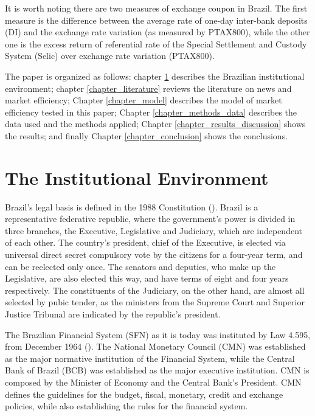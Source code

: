 \documentclass[cic,tc, english]{iiufrgs}
\begin{document}
    It is worth noting there are two measures of exchange coupon in Brazil. The first measure is the difference between the average rate of one-day inter-bank deposits (DI) and the exchange rate variation (as measured by PTAX800), while the other one is the excess return of referential rate of the Special Settlement and Custody System (Selic) over exchange rate variation (PTAX800). 
  
    The paper is organized as follows: chapter \ref{chapter_institutional} describes the Brazilian institutional environment; chapter \ref{chapter_literature} reviews the literature on news and market efficiency; Chapter \ref{chapter_model} describes the model of market efficiency tested in this paper; Chapter \ref{chapter_methods_data} describes the data used and the methods applied; Chapter \ref{chapter_results_discussion} shows the results; and finally Chapter \ref{chapter_conclusion} shows the conclusions.

\chapter{The Institutional Environment} \label{chapter_institutional}

    Brazil's legal basis is defined in the 1988 Constitution (\citet{constituicao}). Brazil is a representative federative republic, where the government's power is divided in three branches, the Executive, Legislative and Judiciary, which are independent of each other. The country's president, chief of the Executive, is elected via universal direct secret compulsory vote by the citizens for a four-year term, and can be reelected only once. The senators and deputies, who make up the Legislative, are also elected this way, and have terms of eight and four years respectively. The constituents of the Judiciary, on the other hand, are almost all selected by pubic tender, as the ministers from the Supreme Court and Superior Justice Tribunal are indicated by the republic's president.

    The Brazilian Financial System (SFN) as it is today was instituted by Law 4.595, from December 1964 (\citet{lei4595}). The National Monetary Council (CMN) was established as the major normative institution of the Financial System, while the Central Bank of Brazil (BCB) was established as the major executive institution. CMN is composed by the Minister of Economy and the Central Bank's President. CMN defines the guidelines for the budget, fiscal, monetary, credit and exchange policies, while also establishing the rules for the financial system.
\end{document}
